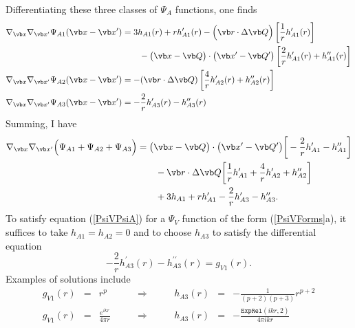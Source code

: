 \documentclass[letterpaper]{article}
\begin{document}
Differentiating these three classes of $\Psi_A$ functions, one finds
\begin{align*}
 \nabla_{\vb x} \nabla_{\vb x^\prime}
 \Psi_{A1}(\vb x-\vb x^\prime)
&=  3h_{A1}(r) + rh_{A1}^\prime(r) 
     -  \Big(\vb r \cdot \Delta \vb Q \Big)
       \left[\frac{1}{r} h_{A1}^\prime(r)\right]
\\
&\qquad
     - \big(\vb x-\vb Q\big)\cdot\big(\vb x^\prime - \vb Q^\prime\big)
       \left[ \frac{2}{r}h_{A1}^\prime(r) + h_{A1}^{\prime\prime}(r)\right]
\\
 \nabla_{\vb x} \nabla_{\vb x^\prime}
 \Psi_{A2}(\vb x-\vb x^\prime)
&=-(\vb r \cdot \Delta \vb Q)  
   \left[ \frac{4}{r}h_{A2}^\prime(r)
          +h_{A2}^{\prime\prime}(r) 
   \right]
\\
 \nabla_{\vb x} \nabla_{\vb x^\prime}
 \Psi_{A3}(\vb x-\vb x^\prime)
&= -\frac{2}{r}h_{A3}^\prime(r) - h_{A3}^{\prime\prime}(r)
\end{align*}
Summing, I have
\begin{align*}
 \nabla_{\vb x} \nabla_{\vb x^\prime}
\Big( \Psi_{A1} + \Psi_{A2} + \Psi_{A3} \Big)
&=\big(\vb x-\vb Q\big) \cdot \big(\vb x^\prime-\vb Q^\prime\big)
  \bigg[ - \frac{2}{r}h^\prime_{A1}
         -h^{\prime\prime}_{A1} 
  \bigg]
\\
&\qquad - \vb r \cdot \Delta \vb Q
          \bigg[\frac{1}{r} h^\prime_{A1} + \frac{4}{r}h^\prime_{A2}
               +h^{\prime\prime}_{A2}\bigg]
\\
&\qquad
 + 3h_{A1} + r h_{A1}^\prime
          - \frac{2}{r}h^\prime_{A3} - h^{\prime\prime}_{A3}.
\end{align*}
To satisfy equation (\ref{PsiVPsiA}) for a $\Psi_V$ function
of the form (\ref{PsiVForms}a), it suffices to take $h_{A1}=h_{A2}=0$
and to choose $h_{A3}$ to satisfy the differential equation
$$ - \frac{2}{r}h^\prime_{A3}(r) - h^{\prime\prime}_{A3}(r) = g_{V1}(r).$$
Examples of solutions include
$$\begin{array}{lclclcl}
 \displaystyle{ g_{V1}(r) }
 &=& 
 \displaystyle{ r^p  }
 \qquad &\Longrightarrow& \qquad
 \displaystyle{ h_{A3}(r) }
 &=& 
 \displaystyle{-\frac{1}{(p+2)(p+3)} r^{p+2}}
\\[12pt]
 \displaystyle{ g_{V1}(r) }
 &=& 
 \displaystyle{ \frac{e^{ikr}}{4\pi r} }
 \qquad &\Longrightarrow& \qquad
 \displaystyle{ h_{A3}(r) }
 &=& 
 \displaystyle{-\frac{\texttt{ExpRel}(ikr,2)}{4\pi ikr}}
\end{array}
$$
\end{document}

